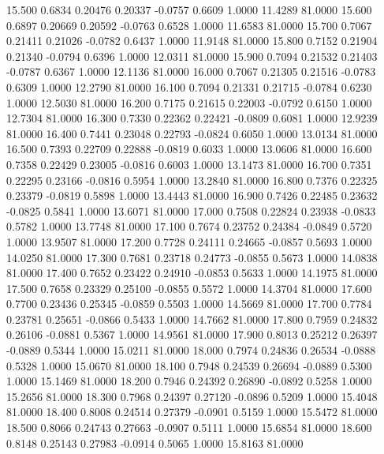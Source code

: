   15.500   0.6834   0.20476   0.20337  -0.0757   0.6609   1.0000  11.4289  81.0000
  15.600   0.6897   0.20669   0.20592  -0.0763   0.6528   1.0000  11.6583  81.0000
  15.700   0.7067   0.21411   0.21026  -0.0782   0.6437   1.0000  11.9148  81.0000
  15.800   0.7152   0.21904   0.21340  -0.0794   0.6396   1.0000  12.0311  81.0000
  15.900   0.7094   0.21532   0.21403  -0.0787   0.6367   1.0000  12.1136  81.0000
  16.000   0.7067   0.21305   0.21516  -0.0783   0.6309   1.0000  12.2790  81.0000
  16.100   0.7094   0.21331   0.21715  -0.0784   0.6230   1.0000  12.5030  81.0000
  16.200   0.7175   0.21615   0.22003  -0.0792   0.6150   1.0000  12.7304  81.0000
  16.300   0.7330   0.22362   0.22421  -0.0809   0.6081   1.0000  12.9239  81.0000
  16.400   0.7441   0.23048   0.22793  -0.0824   0.6050   1.0000  13.0134  81.0000
  16.500   0.7393   0.22709   0.22888  -0.0819   0.6033   1.0000  13.0606  81.0000
  16.600   0.7358   0.22429   0.23005  -0.0816   0.6003   1.0000  13.1473  81.0000
  16.700   0.7351   0.22295   0.23166  -0.0816   0.5954   1.0000  13.2840  81.0000
  16.800   0.7376   0.22325   0.23379  -0.0819   0.5898   1.0000  13.4443  81.0000
  16.900   0.7426   0.22485   0.23632  -0.0825   0.5841   1.0000  13.6071  81.0000
  17.000   0.7508   0.22824   0.23938  -0.0833   0.5782   1.0000  13.7748  81.0000
  17.100   0.7674   0.23752   0.24384  -0.0849   0.5720   1.0000  13.9507  81.0000
  17.200   0.7728   0.24111   0.24665  -0.0857   0.5693   1.0000  14.0250  81.0000
  17.300   0.7681   0.23718   0.24773  -0.0855   0.5673   1.0000  14.0838  81.0000
  17.400   0.7652   0.23422   0.24910  -0.0853   0.5633   1.0000  14.1975  81.0000
  17.500   0.7658   0.23329   0.25100  -0.0855   0.5572   1.0000  14.3704  81.0000
  17.600   0.7700   0.23436   0.25345  -0.0859   0.5503   1.0000  14.5669  81.0000
  17.700   0.7784   0.23781   0.25651  -0.0866   0.5433   1.0000  14.7662  81.0000
  17.800   0.7959   0.24832   0.26106  -0.0881   0.5367   1.0000  14.9561  81.0000
  17.900   0.8013   0.25212   0.26397  -0.0889   0.5344   1.0000  15.0211  81.0000
  18.000   0.7974   0.24836   0.26534  -0.0888   0.5328   1.0000  15.0670  81.0000
  18.100   0.7948   0.24539   0.26694  -0.0889   0.5300   1.0000  15.1469  81.0000
  18.200   0.7946   0.24392   0.26890  -0.0892   0.5258   1.0000  15.2656  81.0000
  18.300   0.7968   0.24397   0.27120  -0.0896   0.5209   1.0000  15.4048  81.0000
  18.400   0.8008   0.24514   0.27379  -0.0901   0.5159   1.0000  15.5472  81.0000
  18.500   0.8066   0.24743   0.27663  -0.0907   0.5111   1.0000  15.6854  81.0000
  18.600   0.8148   0.25143   0.27983  -0.0914   0.5065   1.0000  15.8163  81.0000
